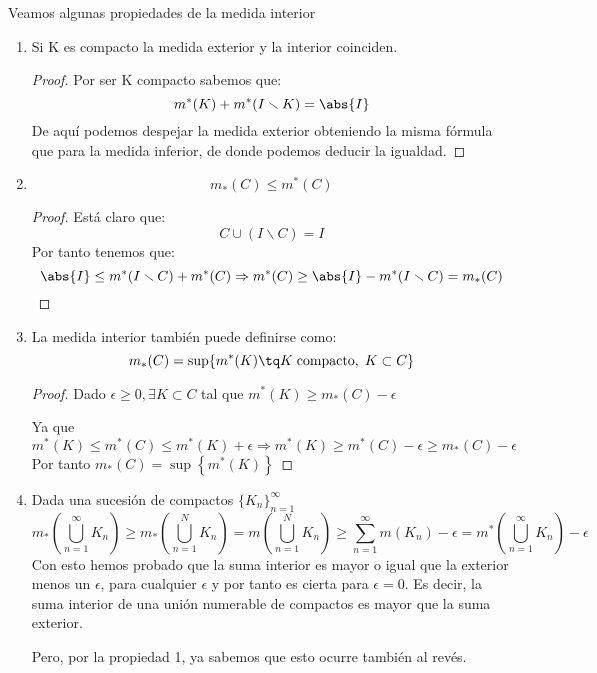 \documentclass{apuntes}
\begin{document}
Veamos algunas propiedades de la medida interior
\begin{enumerate}
%
\item Si K es compacto la medida exterior y la interior coinciden.
\begin{proof}
Por ser K compacto sabemos que:
\[m^*(K) + m^*(I\smallsetminus K) = \abs{I}\]
De aquí podemos despejar la medida exterior obteniendo la misma fórmula que para la medida inferior, de donde podemos deducir la igualdad.
\end{proof}

%
\item \[m_*(C) \leq m^*(C)\]
\begin{proof}
Está claro que:
\[C \cup (I \smallsetminus C) = I\]
Por tanto tenemos que:
\[\abs{I} \leq m^*(I \smallsetminus C) + m^*(C) \Rightarrow m^*(C) \geq \abs{I} - m^*(I \smallsetminus C) = m_*(C)\]
\end{proof}

%
\item La medida interior también puede definirse como:
\[m_*(C) = \sup \lbrace  m^*(K) \tq  K\;\text{compacto},\; K \subset C \rbrace \]

\begin{proof}
Dado $\epsilon \geq 0, \exists K \subset C$ tal que $m^*(K) \geq m_*(C) - \epsilon$

Ya que
\[m^*(K) \leq m^*(C) \leq m^*(K) + \epsilon
\Rightarrow m^{*}(K) \geq m^*(C) - \epsilon \geq m_*(C) - \epsilon\]
Por tanto $m_*(C) = \sup\left\{m^*(K)\right\}$
\end{proof}

%
\item Dada una sucesión de compactos $\lbrace K_n \rbrace_{n=1}^{\infty}$
\[m_*(\bigcup_{n=1}^{\infty}K_n) \geq m_*(\bigcup_{n=1}^{N}K_n)= m(\bigcup_{n=1}^{N}K_n) \geq \sum_{n=1}^{\infty}m(K_n)-\epsilon = m^*(\bigcup_{n=1}^{\infty}K_n) - \epsilon\]
Con esto hemos probado que la suma interior es mayor o igual que la exterior menos un $\epsilon$, para cualquier $\epsilon$ y por tanto es cierta para $\epsilon = 0$. Es decir, la suma interior de una unión numerable de compactos es mayor que la suma exterior.

Pero, por la propiedad 1, ya sabemos que esto ocurre también al revés.


\end{enumerate}
\end{document}
